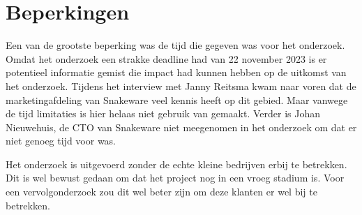 \section{Beperkingen}
Een van de grootste beperking was de tijd die gegeven was voor het onderzoek.
Omdat het onderzoek een strakke deadline had van 22 november 2023 is er potentieel informatie gemist die impact had kunnen hebben op de uitkomst van het onderzoek.
Tijdens het interview met Janny Reitsma kwam naar voren dat de marketingafdeling van Snakeware veel kennis heeft op dit gebied.
Maar vanwege de tijd limitaties is hier helaas niet gebruik van gemaakt.
Verder is Johan Nieuwehuis, de CTO van Snakeware niet meegenomen in het onderzoek om dat er niet genoeg tijd voor was.

\whitespace
Het onderzoek is uitgevoerd zonder de echte kleine bedrijven erbij te betrekken.
Dit is wel bewust gedaan om dat het project nog in een vroeg stadium is.
Voor een vervolgonderzoek zou dit wel beter zijn om deze klanten er wel bij te betrekken.
